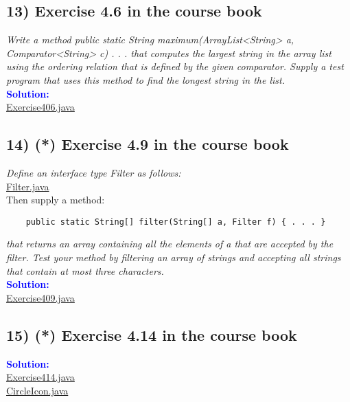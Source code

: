 \documentclass[main.tex]{subfiles}
\begin{document}
\subsection*{13) Exercise 4.6 in the course book}
\hypertarget{E13}{ }
\textit{Write a method
public static String maximum(ArrayList<String> a, Comparator<String> c) { . . . }
that computes the largest string in the array list using the ordering relation that is defined by the
given comparator. Supply a test program that uses this method to find the longest string in the
list.}\\
\indent \textbf{\textcolor{blue}{Solution:}}\\
\hyperlink{Exercise406}{Exercise406.java}

\subsection*{14) (*) Exercise 4.9 in the course book}
\hypertarget{E14}{ }
\textit{Define an interface type Filter as follows:}\\
\hyperlink{Filter}{Filter.java}\\
Then supply a method:
\begin{verbatim}
    public static String[] filter(String[] a, Filter f) { . . . }   
\end{verbatim}
\textit{that returns an array containing all the elements of a that are accepted by the filter. Test your
method by filtering an array of strings and accepting all strings that contain at most three characters.
}\\
\indent \textbf{\textcolor{blue}{Solution:}} \\
\hyperlink{Exercise409}{Exercise409.java}

\subsection*{15) (*) Exercise 4.14 in the course book}
\hypertarget{E15}{ }
\indent \textbf{\textcolor{blue}{Solution:}} \\
\hyperlink{Exercise414}{Exercise414.java}\\
\hyperlink{CircleIcon}{CircleIcon.java}
\end{document}
